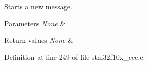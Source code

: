 Starts a new message. 


\begin{DoxyParams}{Parameters}
{\em None} & \\
\hline
\end{DoxyParams}

\begin{DoxyRetVals}{Return values}
{\em None} & \\
\hline
\end{DoxyRetVals}


Definition at line 249 of file stm32f10x\-\_\-cec.\-c.

